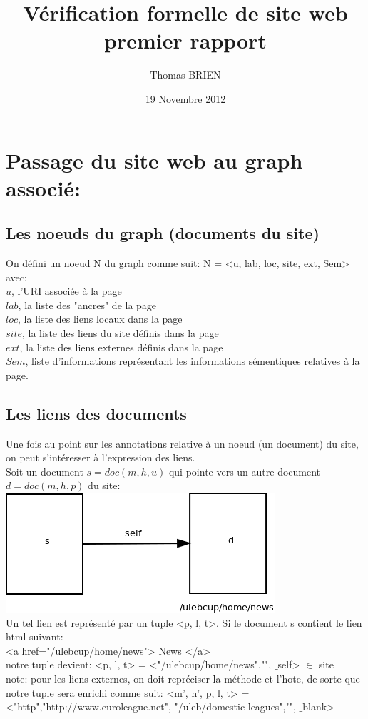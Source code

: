 \documentclass[a4paper]{article}
\title{Vérification formelle de site web\\premier rapport}
\author{Thomas BRIEN}
\date{19 Novembre 2012}
\begin{document}
\maketitle
\section{Passage du site web au graph associé:\\}


\subsection*{ Les noeuds du graph (documents du site)\\ }
 On défini un noeud N du graph comme suit: N = <u, lab, loc, site, ext, Sem>\\
 avec:\\
 $u$, l'URI associée à la page\\
 $lab$, la liste des "ancres" de la page\\
 $loc$, la liste des liens locaux dans la page\\
 $site$, la liste des liens du site définis dans la page\\
 $ext$, la liste des liens externes définis dans la page\\
 $Sem$, liste d'informations représentant les informations sémentiques relatives à la page.\\
 
\subsection*{ Les liens des documents\\ }
Une fois au point sur les annotations relative à un noeud (un document) du site, on peut s'intéresser à l'expression des liens.\\
Soit un document $s = doc(m,h,u)$ qui pointe vers un autre document $d = doc(m,h,p)$ du site:\\
\includegraphics[scale=0.6]{lienSimple.png}\\
Un tel lien est représenté par un tuple <p, l, t>. Si le document s contient le lien html suivant:\\
<a href="/ulebcup/home/news"> News </a>\\
notre tuple devient: <p, l, t> = <"/ulebcup/home/news","", $\_$self> $\in$ site\\
note: pour les liens externes, on doit repréciser la méthode et l'hote, de sorte que notre tuple sera enrichi comme suit: <m', h', p, l, t> = <"http","http://www.euroleague.net",
"/uleb/domestic-leagues","", $\_$blank>\\
\end{document}
